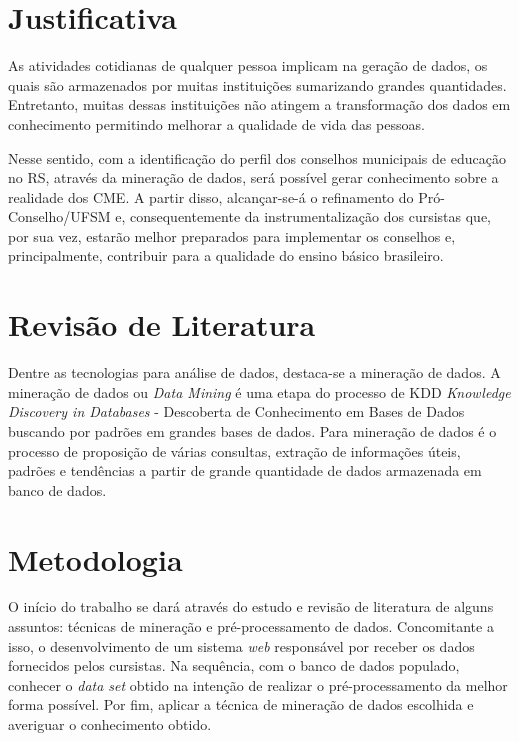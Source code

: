 \documentclass[projtg]{mdtufsm}
\begin{document}
\chapter{Justificativa}
As atividades cotidianas de qualquer pessoa implicam na geração de dados, os quais são armazenados por muitas instituições sumarizando grandes quantidades. Entretanto, muitas dessas instituições não atingem a transformação dos dados em conhecimento permitindo melhorar a qualidade de vida das pessoas. 

Nesse sentido, com a identificação do perfil dos conselhos municipais de educação no RS, através da mineração de dados, será possível gerar conhecimento sobre a realidade dos CME. A partir disso, alcançar-se-á o refinamento do Pró-Conselho/UFSM e, consequentemente da instrumentalização dos cursistas que, por sua vez, estarão melhor preparados para implementar os conselhos e, principalmente, contribuir para a qualidade do ensino básico brasileiro.   


\chapter{Revisão de Literatura}

Dentre as tecnologias para análise de dados, destaca-se a mineração de dados. A mineração de dados ou {\it Data Mining} é uma etapa do processo de KDD {\it Knowledge Discovery in Databases} - Descoberta de Conhecimento em Bases de Dados buscando por padrões em grandes bases de dados. Para \cite{Han-kamber2nd} mineração de dados é o processo de proposição de várias consultas, extração de informações úteis, padrões e tendências a partir de grande quantidade de dados armazenada em banco de dados.








\chapter{Metodologia}
O início do trabalho se dará através do estudo e revisão de literatura de alguns assuntos: técnicas de mineração e pré-processamento de dados. Concomitante a isso, o desenvolvimento de um sistema {\it web} responsável por receber os dados fornecidos pelos cursistas. Na sequência, com o banco de dados populado, conhecer o \textit{data set} obtido na intenção de realizar o pré-processamento da melhor forma possível. Por fim, aplicar a técnica de mineração de dados escolhida e averiguar o conhecimento obtido. 
    
\end{document}
